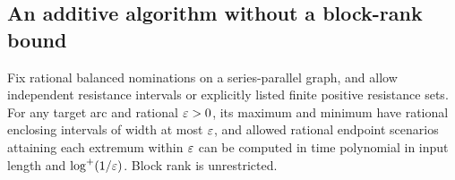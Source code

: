 \subsection{An additive algorithm without a block-rank bound}
\label{subsec:a-bound-envelope-algorithm}

\begin{theorem}
\label{thm:a-bound-envelope-algorithm}
Fix rational balanced nominations on a series-parallel graph, and allow
independent resistance intervals or explicitly listed finite positive
resistance sets. For any target arc and rational $\varepsilon>0$, its maximum
and minimum have rational enclosing intervals of width at most $\varepsilon$,
and allowed rational endpoint scenarios attaining each extremum within
$\varepsilon$ can be computed in time polynomial in input length and
$\log^+(1/\varepsilon)$. Block rank is unrestricted.
\end{theorem}
